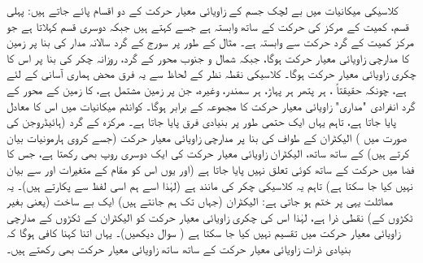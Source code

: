 کلاسیکی میکانیات میں بے لچک جسم کے زاویائی معیار حرکت کے دو اقسام پائے جاتے ہیں:  پہلی قسم،   کمیت کے مرکز کی  حرکت کے ساتھ وابستہ ہے جسے     کہتے ہیں جبکہ دوسری  قسم   
  کہلاتا ہے  جو مرکز کمیت کے گرد حرکت سے وابستہ ہے۔ مثال کے طور پر سورج کے گرد سالانہ مدار کی بنا پر زمین کا مدارچی زاویائی معیار حرکت ہوگا، جبکہ شمال و  جنوب محور کے گرد، روزانہ چکر کی بنا پر اس کا چکری زاویائی معیار حرکت ہوگا۔  کلاسیکی  نقطہ نظر کے لحاظ سے  یہ فرق  محض ہماری آسانی کے لئے ہے،  چونکہ حقیقتاً ،  ہر پتھر ہر پہاڑ، ہر سمندر،  وغیرہ،  جن پر زمین مشتمل ہے،  کا زمین کے محور کے گرد انفرادی "مداری" زاویائی معیار حرکت کا مجموعہ   کے برابر ہوگا۔  کوانٹم میکانیات میں اس کا معادل پایا جاتا ہے، تاہم  یہاں ایک حتمی  طور پر  بنیادی فرق پایا جاتا ہے۔ مرکزہ کے گرد  (ہائیڈروجن کی صورت میں )  الیکٹران کے  طواف کی بنا پر مدارچی زاویائی معیار حرکت (جسے کروی ہارمونیات بیان کرتے ہیں) کے ساتھ ساتھ،  الیکٹران زاویائی معیار حرکت کی ایک دوسری روپ بھی رکھتا ہے، جس کا فضا میں حرکت کے ساتھ کوئی تعلق نہیں پایا جاتا ہے (اور یوں  اس کو مقام کے متغیرات   اور  سے بیان نہیں کیا جا سکتا ہے) تاہم   یہ کلاسیکی چکر کی مانند ہے (لہٰذا اسے ہم اسی لفظ سے پکارتے ہیں)۔  یہ مماثلت یہی پر ختم ہو جاتی ہے:   الیکٹران (جہاں تک ہم جانتے ہیں) ایک   بے ساخت (یعنی بغیر ٹکڑوں کے)   نقطی ذرا ہے،  لہٰذا اس کی چکری زاویائی معیار حرکت کو الیکٹران  کے ٹکڑوں کے  مدارچی زاویائی معیار حرکت   میں تقسیم نہیں کیا  جا سکتا ہے ( سوال  دیکھیں)۔   یہاں اتنا کہنا کافی ہوگا کہ بنیادی ذرات    زاویائی معیار حرکت  کے ساتھ ساتھ     زاویائی معیار حرکت  بھی رکھتے ہیں۔

